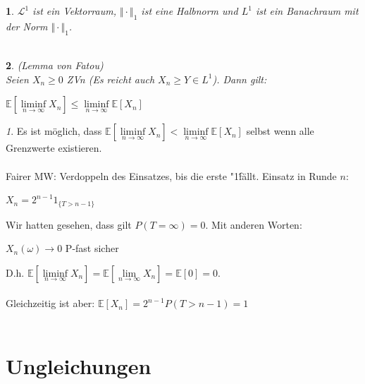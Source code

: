 \documentclass[10pt,a4paper]{report}
\numberwithin{equation}{section}
\numberwithin{figure}{section}
\theoremstyle{plain}
\theoremstyle{definition}
\theoremstyle{plain}
\newtheorem{prop}{\protect\propositionname}[section]
\theoremstyle{definition}
\theoremstyle{remark}
\newtheorem{rem}{\protect\remarkname}[section]
\theoremstyle{plain}
\theoremstyle{plain}
\theoremstyle{plain}
\theoremstyle{plain}
\theoremstyle{plain}
\providecommand{\propositionname}{Satz}
\providecommand{\remarkname}{Bemerkung}
\newcommand{\1}{ \mathbb{1} } %
\begin{document}
\begin{prop}
  $\mathcal{L}^1$ ist ein Vektorraum, $\Vert \cdot \Vert_1$ ist eine Halbnorm und $L^1$ ist ein Banachraum mit der Norm $\Vert \cdot \Vert_1$.\\\\
\end{prop}
\begin{prop}  (Lemma von Fatou)\\
  Seien $X_n\geq 0$ ZVn (Es reicht auch $X_n \geq Y \in L^1$). Dann
  gilt:
  \begin{center}
    $\mathbb{E}[\liminf\limits_{n \to \infty} X_n]\leq
    \liminf\limits_{n \to \infty} \mathbb{E}[X_n]$
  \end{center}
\end{prop}
\begin{rem}
  Es ist möglich, dass $\mathbb{E}[\liminf\limits_{n \to \infty} X_n] < \liminf\limits_{n \to \infty} \mathbb{E}[X_n]$ selbst wenn alle Grenzwerte existieren.\\\\
  Fairer MW: Verdoppeln des Einsatzes, bis die erste "1\'
  fällt. Einsatz in Runde $n$:
  \begin{center}
    $X_n=2^{n-1}1_{\{T>n-1\}}$
  \end{center}
  Wir hatten gesehen, dass gilt $P(T=\infty)=0$. Mit anderen Worten:
  \begin{center}
    $X_n(\omega) \to 0$ P-fast sicher
  \end{center}
  D.h. $\mathbb{E}[\liminf\limits_{n \to \infty} X_n]=\mathbb{E}[\lim\limits_{n \to \infty} X_n]=\mathbb{E}[0]=0$.\\\\
  Gleichzeitig ist aber: $\mathbb{E}[X_n]=2^{n-1}P(T>n-1)=1$\\\\
\end{rem}

\section{Ungleichungen}
\label{sec:ungleichungen}
\end{document}
